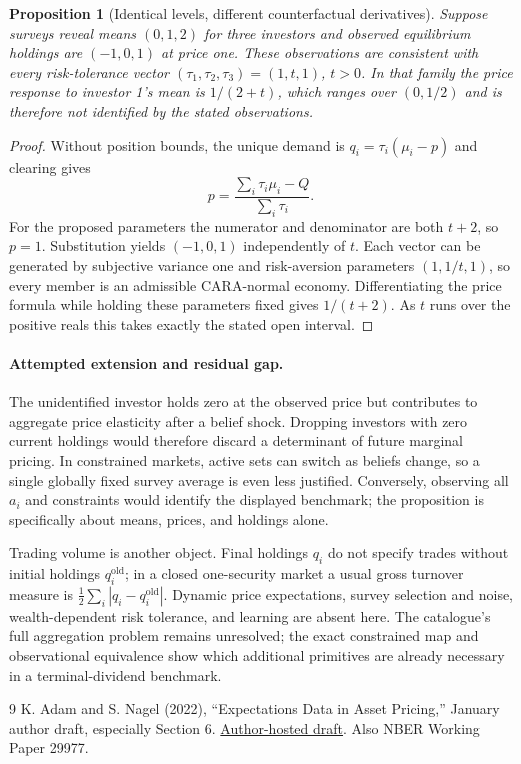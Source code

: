 \documentclass[11pt]{article}
\newtheorem{proposition}[theorem]{Proposition}
\theoremstyle{definition}
\begin{document}
\begin{proposition}[Identical levels, different counterfactual derivatives]
Suppose surveys reveal means $(0,1,2)$ for three investors and observed equilibrium holdings are $(-1,0,1)$ at price one. These observations are consistent with every risk-tolerance vector $(\tau_1,\tau_2,\tau_3)=(1,t,1)$, $t>0$. In that family the price response to investor 1's mean is $1/(2+t)$, which ranges over $(0,1/2)$ and is therefore not identified by the stated observations.
\end{proposition}
\begin{proof}
Without position bounds, the unique demand is $q_i=\tau_i(\mu_i-p)$ and clearing gives
\[
 p=\frac{\sum_i\tau_i\mu_i-Q}{\sum_i\tau_i}.
\]
For the proposed parameters the numerator and denominator are both $t+2$, so $p=1$. Substitution yields $(-1,0,1)$ independently of $t$. Each vector can be generated by subjective variance one and risk-aversion parameters $(1,1/t,1)$, so every member is an admissible CARA-normal economy. Differentiating the price formula while holding these parameters fixed gives $1/(t+2)$. As $t$ runs over the positive reals this takes exactly the stated open interval.
\end{proof}

\paragraph{Attempted extension and residual gap.}
The unidentified investor holds zero at the observed price but contributes to aggregate price elasticity after a belief shock. Dropping investors with zero current holdings would therefore discard a determinant of future marginal pricing. In constrained markets, active sets can switch as beliefs change, so a single globally fixed survey average is even less justified. Conversely, observing all $a_i$ and constraints would identify the displayed benchmark; the proposition is specifically about means, prices, and holdings alone.

Trading volume is another object. Final holdings $q_i$ do not specify trades without initial holdings $q_i^{\mathrm{old}}$; in a closed one-security market a usual gross turnover measure is $\frac12\sum_i|q_i-q_i^{\mathrm{old}}|$. Dynamic price expectations, survey selection and noise, wealth-dependent risk tolerance, and learning are absent here. The catalogue's full aggregation problem remains unresolved; the exact constrained map and observational equivalence show which additional primitives are already necessary in a terminal-dividend benchmark.

\begin{thebibliography}{9}
 K. Adam and S. Nagel (2022), ``Expectations Data in Asset Pricing,'' January author draft, especially Section 6. \href{https://bpb-us-w2.wpmucdn.com/voices.uchicago.edu/dist/f/575/files/2022/01/ExpectationsSurvey_13.pdf}{Author-hosted draft}. Also NBER Working Paper 29977.
\end{thebibliography}
\end{document}
